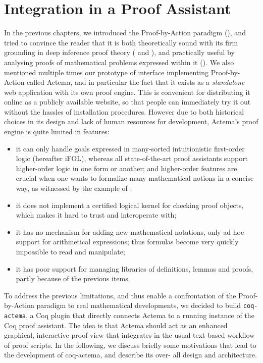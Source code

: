 \setchapterpreamble[u]{\margintoc}
\chapter{Integration in a Proof Assistant}

In the previous chapters, we introduced the Proof-by-Action paradigm
(), and tried to convince the reader that it is both theoretically
sound with its firm grounding in deep inference proof theory ( and
), and practically useful by analysing proofs of
mathematical problems expressed within it (). We also mentioned
multiple times our prototype of interface implementing Proof-by-Action called
Actema, and in particular the fact that it exists as a \emph{standalone} web
application with its own proof engine. This is convenient for distributing it
online as a publicly available website, so that people can immediately try it
out without the hassles of installation procedures. However due to both
historical choices in its design and lack of human resources for development,
Actema's proof engine is quite limited in features:
\begin{itemize}
  \item it can only handle goals expressed in many-sorted intuitionistic
    first-order logic (hereafter iFOL), whereas all state-of-the-art proof
    assistants support higher-order logic in one form or another; and higher-order
    features are crucial when one wants to formalize many mathematical notions in a
    concise way, as witnessed by the example of ;
  \item it does not implement a certified logical kernel for checking proof
    objects, which makes it hard to trust and interoperate with;
  \item it has no mechanism for adding new mathematical notations, only ad hoc
    support for arithmetical expressions; thus formulas become very quickly
    impossible to read and manipulate;
  \item it has poor support for managing libraries of definitions, lemmas and
    proofs, partly because of the previous items.
\end{itemize}
To address the previous limitations, and thus enable a confrontation of the
Proof-by-Action paradigm to real mathematical developments, we decided to build
\texttt{coq-actema}, a Coq plugin that directly connects Actema to a running
instance of the Coq proof assistant. The idea is that Actema should act as an
enhanced graphical, interactive proof view that integrates in the usual
text-based workflow of proof scripts. In the following, we discuss briefly some
motivations that lead to the development of coq-actema, and describe its over-
all design and architecture.